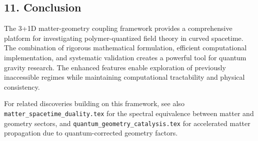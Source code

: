 \documentclass[12pt]{article}
\begin{document}
\subsection*{11. Conclusion}
The 3+1D matter-geometry coupling framework provides a comprehensive platform for investigating polymer-quantized field theory in curved spacetime. The combination of rigorous mathematical formulation, efficient computational implementation, and systematic validation creates a powerful tool for quantum gravity research. The enhanced features enable exploration of previously inaccessible regimes while maintaining computational tractability and physical consistency.

For related discoveries building on this framework, see also \texttt{matter\_spacetime\_duality.tex} for the spectral equivalence between matter and geometry sectors, and \texttt{quantum\_geometry\_catalysis.tex} for accelerated matter propagation due to quantum-corrected geometry factors.
\end{document}
